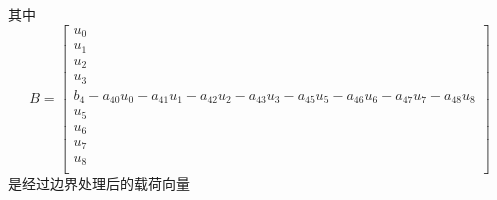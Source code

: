 \documentclass[12pt,a4paper]{article}
\begin{document}
其中
$$
B=\begin{bmatrix}
u_{0} \\
u_{1} \\
u_{2} \\
u_{3} \\
b_4-a_{40}u_0-a_{41}u_1-a_{42}u_2-a_{43}u_3-a_{45}u_5-a_{46}u_6-a_{47}u_7-a_{48}u_8 \\
u_{5} \\
u_{6} \\
u_{7} \\
u_{8} \\
\end{bmatrix}
$$
是经过边界处理后的载荷向量



































%

%
\end{document}
